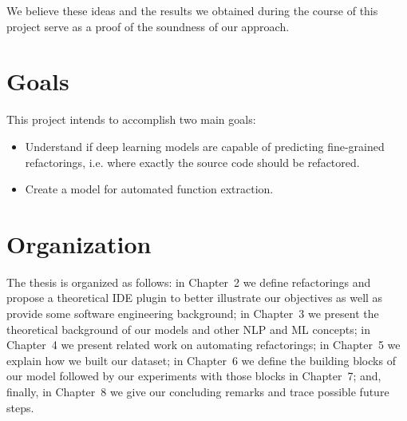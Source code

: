 We believe these ideas and the results we obtained during the course of this project serve as a proof of the soundness of our approach.


\section{Goals}

This project intends to accomplish two main goals:

\begin{itemize}
\item Understand if deep learning models are capable of predicting fine-grained refactorings, i.e. where exactly the source code should be refactored.
\item Create a model for automated function extraction.
\end{itemize}

\section{Organization}
The thesis is organized as follows: in Chapter~2 we define refactorings and propose a theoretical IDE plugin to better illustrate our objectives as well as provide some software engineering background; in
Chapter~3 we present the theoretical background of our models and other NLP and ML concepts; in Chapter~4 we present related work on automating refactorings; in Chapter~5 we explain how we built our dataset; in Chapter~6 we define the building blocks of our model followed by our experiments with those blocks in Chapter~7; and, finally, in Chapter~8 we give our concluding remarks and trace possible future steps.
